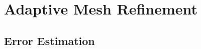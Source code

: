\chapter{Adaptive Mesh Refinement} \label{chapter:adaptive_mesh_refinement} 

\section{Error Estimation} \label{section:error_estimation}